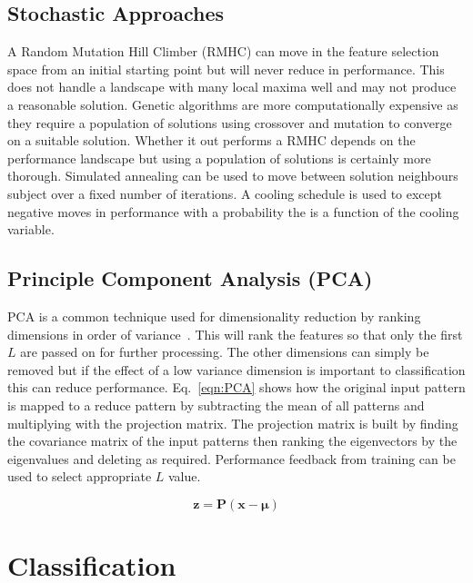 \documentclass[journal]{IEEEtran}
\begin{document}
\subsection{Stochastic Approaches}
A Random Mutation Hill Climber (RMHC) can move in the feature selection space from an initial starting point but will never reduce in performance.  
This does not handle a landscape with many local maxima well and may not produce a reasonable solution.
Genetic algorithms are more computationally expensive as they require a population of solutions using crossover and mutation to converge on a suitable solution.   
Whether it out performs a RMHC depends on the performance landscape but using a population of solutions is certainly more thorough.    
Simulated annealing can be used to move between solution neighbours subject over a fixed number of iterations.
A cooling schedule is used to except negative moves in performance with a probability the is a function of the cooling variable. 


\subsection{Principle Component Analysis (PCA)}
PCA is a common technique used for dimensionality reduction by ranking dimensions in order of variance~\cite{pearson01pca}.
This will rank the features so that only the first $L$ are passed on for further processing. 
The other dimensions can simply be removed but if the effect of a low variance dimension is important to classification this can reduce performance.
Eq.~\eqref{eqn:PCA} shows how the original input pattern is mapped to a reduce pattern by subtracting the mean of all patterns and multiplying with the projection matrix.
The projection matrix is built by finding the covariance matrix of the input patterns then ranking the eigenvectors by the eigenvalues and deleting as required.
Performance feedback from training can be used to select appropriate $L$ value.

\begin{equation}
	\boldsymbol{z} = \boldsymbol{P}(\boldsymbol{x} - \boldsymbol{\mu})
	\label{eqn:PCA}
\end{equation}












\section{Classification}
\label{sec:class}
\end{document}
